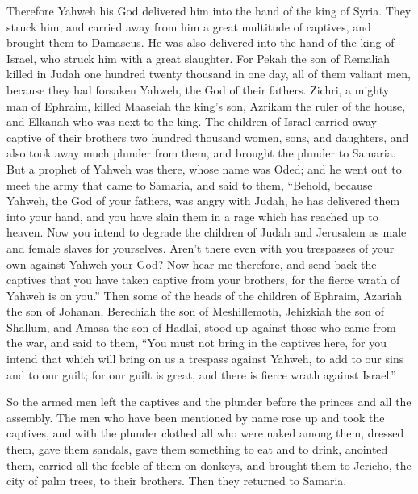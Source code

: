  Therefore Yahweh his God delivered him into the hand of the
king of Syria. They struck him, and carried away from him a great
multitude of captives, and brought them to Damascus. He was also
delivered into the hand of the king of Israel, who struck him with a
great slaughter.  For Pekah the son of Remaliah killed in
Judah one hundred twenty thousand in one day, all of them valiant men,
because they had forsaken Yahweh, the God of their fathers. 
Zichri, a mighty man of Ephraim, killed Maaseiah the king's son, Azrikam
the ruler of the house, and Elkanah who was next to the king.
 The children of Israel carried away captive of their
brothers two hundred thousand women, sons, and daughters, and also took
away much plunder from them, and brought the plunder to Samaria.
 But a prophet of Yahweh was there, whose name was Oded; and
he went out to meet the army that came to Samaria, and said to them,
``Behold, because Yahweh, the God of your fathers, was angry with Judah,
he has delivered them into your hand, and you have slain them in a rage
which has reached up to heaven.  Now you intend to degrade
the children of Judah and Jerusalem as male and female slaves for
yourselves. Aren't there even with you trespasses of your own against
Yahweh your God?  Now hear me therefore, and send back the
captives that you have taken captive from your brothers, for the fierce
wrath of Yahweh is on you.''  Then some of the heads of the
children of Ephraim, Azariah the son of Johanan, Berechiah the son of
Meshillemoth, Jehizkiah the son of Shallum, and Amasa the son of Hadlai,
stood up against those who came from the war,  and said to
them, ``You must not bring in the captives here, for you intend that
which will bring on us a trespass against Yahweh, to add to our sins and
to our guilt; for our guilt is great, and there is fierce wrath against
Israel.''

 So the armed men left the captives and the plunder before
the princes and all the assembly.  The men who have been
mentioned by name rose up and took the captives, and with the plunder
clothed all who were naked among them, dressed them, gave them sandals,
gave them something to eat and to drink, anointed them, carried all the
feeble of them on donkeys, and brought them to Jericho, the city of palm
trees, to their brothers. Then they returned to Samaria.

